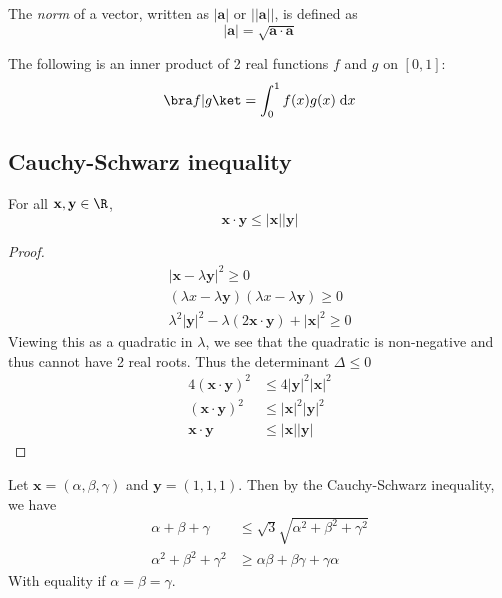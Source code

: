\documentclass[a4paper]{article}
\begin{document}
\begin{defi}
  The \emph{norm} of a vector, written as $|\mathbf{a}|$ or $||\mathbf{a}||$, is defined as
  \[
    |\mathbf{a}| = \sqrt{\mathbf{a\cdot a}}
  \]
\end{defi}

\begin{eg}
  The following is an inner product of 2 real functions $f$ and $g$ on $[0, 1]$:
  \[
    \bra f|g\ket = \int_0^1f(x)g(x)\;\mathrm{d} x
  \]
\end{eg}

\subsection{Cauchy-Schwarz inequality}
\begin{thm}
  For all $\mathbf{x, y}\in \R$,
  \[
    \mathbf{x\cdot y \leq |x||y|}
  \]
\end{thm}

\begin{proof}
  \begin{align*}
    |\mathbf{x} - \lambda\mathbf{y}|^2 \geq 0\\
    (\lambda{x} - \lambda\mathbf{y})(\lambda{x} - \lambda\mathbf{y}) \geq 0\\
    \lambda^2 |\mathbf{y}|^2 - \lambda (2\mathbf{x\cdot y}) + |\mathbf{x}|^2 \geq 0
  \end{align*}
  Viewing this as a quadratic in $\lambda$, we see that the quadratic is non-negative and thus cannot have 2 real roots. Thus the determinant $\Delta \leq 0$
  \begin{align*}
    4(\mathbf{x\cdot y})^2 &\leq 4|\mathbf{y}|^2|\mathbf{x}|^2\\
    (\mathbf{x\cdot y})^2 &\leq |\mathbf{x}|^2|\mathbf{y}|^2\\
    \mathbf{x\cdot y} &\leq \mathbf{|x||y|}
  \end{align*}
\end{proof}

\begin{eg}
  Let $\mathbf{x} = (\alpha, \beta, \gamma)$ and $\mathbf{y} = (1, 1, 1)$. Then by the Cauchy-Schwarz inequality, we have
  \begin{align*}
    \alpha + \beta + \gamma &\leq \sqrt{3}\sqrt{\alpha^2 + \beta^2 + \gamma^2}\\
    \alpha^2 + \beta^2 + \gamma^2 &\geq \alpha\beta + \beta\gamma + \gamma\alpha
  \end{align*}
  With equality if $\alpha = \beta = \gamma$.
\end{eg}
\end{document}
